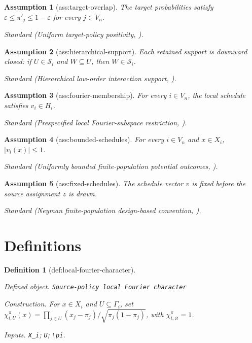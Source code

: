 \documentclass{article}
\newtheorem{assumption}{Assumption}
\newtheorem{definition}{Definition}
\begin{document}
\begin{assumption}[ass:target-overlap]\label{ass:target-overlap}
The target probabilities satisfy \(\varepsilon\le\pi'_j\le1-\varepsilon\) for every \(j\in V_n\).
\par\smallskip\noindent\emph{Standard} (Uniform target-policy positivity, \cite{ChinEcklesUgander2022}).
\end{assumption}

\begin{assumption}[ass:hierarchical-support]\label{ass:hierarchical-support}
Each retained support is downward closed: if \(U\in\mathcal S_i\) and \(W\subseteq U\), then \(W\in\mathcal S_i\).
\par\smallskip\noindent\emph{Standard} (Hierarchical low-order interaction support, \cite{CortezRodriguezEichhornYu2023}).
\end{assumption}

\begin{assumption}[ass:fourier-membership]\label{ass:fourier-membership}
For every \(i\in V_n\), the local schedule satisfies \(v_i\in H_i\).
\par\smallskip\noindent\emph{Standard} (Prespecified local Fourier-subspace restriction, \cite{LoombaEckles2026OffPolicy}).
\end{assumption}

\begin{assumption}[ass:bounded-schedules]\label{ass:bounded-schedules}
For every \(i\in V_n\) and \(x\in X_i\), \( |v_i(x)|\le1\).
\par\smallskip\noindent\emph{Standard} (Uniformly bounded finite-population potential outcomes, \cite{ChenValiantValiant2020}).
\end{assumption}

\begin{assumption}[ass:fixed-schedules]\label{ass:fixed-schedules}
The schedule vector \(v\) is fixed before the source assignment \(z\) is drawn.
\par\smallskip\noindent\emph{Standard} (Neyman finite-population design-based convention, \cite{KandirosHarshawSavje2026Minimax}).
\end{assumption}

\section{Definitions}

\begin{definition}[def:local-fourier-character]\label{def:local-fourier-character}
\par\smallskip\noindent\emph{Defined object.} \texttt{Source-\allowbreak{}policy local Fourier character}
\par\smallskip\noindent\emph{Construction.} For \(x\in X_i\) and \(U\subseteq\Gamma_i\), set \(\chi_{i,U}^{\pi}(x)=\prod_{j\in U}(x_j-\pi_j)/\sqrt{\pi_j(1-\pi_j)}\), with \(\chi_{i,\varnothing}^{\pi}=1\).
\par\smallskip\noindent\emph{Inputs.} \texttt{X\_\allowbreak{}i}; \texttt{U}; \texttt{\textbackslash{}\allowbreak{}pi}.
\end{definition}
\end{document}

